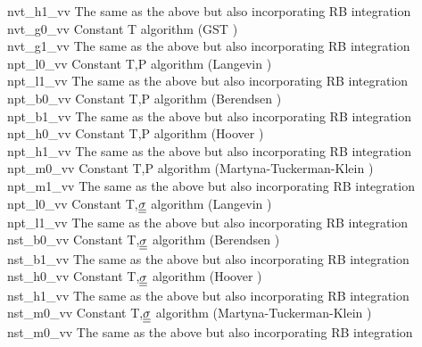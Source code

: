 \begin{tabbing}
{\sc nvt\_h1\_vv}      \> The same as the above but also incorporating RB integration \\
{\sc nvt\_g0\_vv}      \> Constant T algorithm (GST \cite{leimkuhler-09a}) \\
{\sc nvt\_g1\_vv}      \> The same as the above but also incorporating RB integration \\
{\sc npt\_l0\_vv}      \> Constant T,P algorithm (Langevin \cite{quigley-04a}) \\
{\sc npt\_l1\_vv}      \> The same as the above but also incorporating RB integration \\
{\sc npt\_b0\_vv}      \> Constant T,P algorithm (Berendsen \cite{berendsen-84a}) \\
{\sc npt\_b1\_vv}      \> The same as the above but also incorporating RB integration \\
{\sc npt\_h0\_vv}      \> Constant T,P algorithm (Hoover \cite{hoover-85a}) \\
{\sc npt\_h1\_vv}      \> The same as the above but also incorporating RB integration \\
{\sc npt\_m0\_vv}      \> Constant T,P algorithm (Martyna-Tuckerman-Klein \cite{martyna-96a}) \\
{\sc npt\_m1\_vv}      \> The same as the above but also incorporating RB integration \\
{\sc npt\_l0\_vv}      \> Constant T,$\mbox{$\underline{\underline{\bf \sigma}}$}$ algorithm (Langevin \cite{quigley-04a}) \\
{\sc npt\_l1\_vv}      \> The same as the above but also incorporating RB integration \\
{\sc nst\_b0\_vv}      \> Constant T,$\mbox{$\underline{\underline{\bf \sigma}}$}$ algorithm (Berendsen \cite{berendsen-84a}) \\
{\sc nst\_b1\_vv}      \> The same as the above but also incorporating RB integration \\
{\sc nst\_h0\_vv}      \> Constant T,$\mbox{$\underline{\underline{\bf \sigma}}$}$ algorithm (Hoover \cite{hoover-85a}) \\
{\sc nst\_h1\_vv}      \> The same as the above but also incorporating RB integration \\
{\sc nst\_m0\_vv}      \> Constant T,$\mbox{$\underline{\underline{\bf \sigma}}$}$ algorithm (Martyna-Tuckerman-Klein \cite{martyna-96a}) \\
{\sc nst\_m0\_vv}      \> The same as the above but also incorporating RB integration
\end{tabbing}

